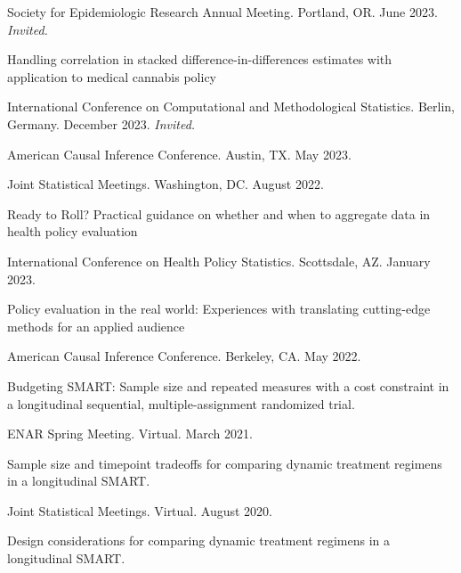 \documentclass[letterpaper,11pt]{article} %
\begin{document}
\begin{etaremune}
		\begin{conflist}
			\item Society for Epidemiologic Research Annual Meeting. Portland, OR. June 2023. \textit{Invited.}
		\end{conflist}
		\item Handling correlation in stacked difference-in-differences estimates with application to medical cannabis policy
		\begin{conflist}
			\item International Conference on Computational and Methodological Statistics. Berlin, Germany. December 2023. \textit{Invited.}
			\item American Causal Inference Conference. Austin, TX. May 2023.
			\item Joint Statistical Meetings. Washington, DC. August 2022.
		\end{conflist}
		\item Ready to Roll? Practical guidance on whether and when to aggregate data in health policy evaluation
		\begin{conflist}
			\item International Conference on Health Policy Statistics. Scottsdale, AZ. January 2023.
		\end{conflist}\item Policy evaluation in the real world: Experiences with translating cutting-edge methods for an applied audience
		\begin{conflist}
			\item American Causal Inference Conference. Berkeley, CA. May 2022.
		\end{conflist}
		\item Budgeting SMART: Sample size and repeated measures with a cost  constraint in a longitudinal sequential, multiple-assignment randomized trial.
		\begin{conflist}
			\item  ENAR Spring Meeting. Virtual. March 2021.
		\end{conflist}
		\item Sample size and timepoint tradeoffs for comparing dynamic treatment regimens in a longitudinal SMART.
		\begin{conflist}
			\item Joint Statistical Meetings. Virtual. August 2020.
		\end{conflist}
		\item Design considerations for comparing dynamic treatment regimens  in a longitudinal SMART.

\end{etaremune}
\end{document}
